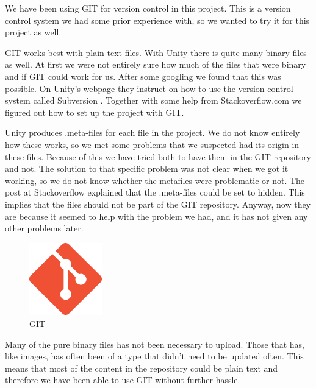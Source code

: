 We have been using GIT for version control in this project. This is a version
control system we had some prior experience with, so we wanted to try it for 
this project as well. 

GIT works best with plain text files. With Unity there is quite many binary
files as well. At first we were not entirely sure how much of the files that
were binary and if GIT could work for us. After some googling we found that 
this was possible. On Unity's webpage they instruct on how to use the version
control system called Subversion \cite{SubversionControl}. Together with some
help from Stackoverflow.com\cite{gitVersionControl} we figured out how to set 
up the project with GIT.

Unity produces .meta-files for each file in the project. We do not know 
entirely how these works, so we met some problems that we suspected had its
origin in these files. Because of this we have tried both to have them in
the GIT repository and not. The solution to that specific problem was not
clear when we got it working, so we do not know whether the metafiles were
problematic or not. The post at Stackoverflow explained that the .meta-files 
could be set to hidden. This implies that the files should not be part
of the GIT repository. Anyway, now they are because it seemed to help with the
problem we had, and it has not given any other problems later.


\begin{figure}
	\capstart
	\centering
	\vspace{-10pt}
	\includegraphics[width=0.28\textwidth]{images/git}
	\vspace{-5pt}
	\caption[GIT logo]{GIT}
	\label{fig:git}
	\vspace{-10pt}
\end{figure}

Many of the pure binary files has not been necessary to upload. Those that
has, like images, has often been of a type that didn't need to be updated
often. This means that most of the content in the repository could be plain
text and therefore we have been able to use GIT without further hassle.

